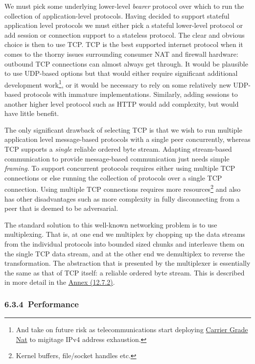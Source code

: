 \documentclass[11pt,a4paper]{article}
\begin{document}
We must pick some underlying lower-level \emph{bearer} protocol over
which to run the collection of application-level protocols. Having
decided to support stateful application level protocols we must either
pick a stateful lower-level protocol or add session or connection
support to a stateless protocol. The clear and obvious choice is then to
use TCP. TCP is the best supported internet protocol when it comes to
the thorny issues surrounding consumer NAT and firewall hardware:
outbound TCP connections can almost always get through. It would be
plausible to use UDP-based options but that would either require
significant additional development work\footnote{And take on future risk
  as telecommunications start deploying
  \href{https://en.wikipedia.org/wiki/Carrier-grade_NAT}{{Carrier Grade
  Nat}} to migitage IPv4 address exhaustion.}, or it would be necessary
to rely on some relatively new UDP-based protocols with immature
implementations. Similarly, adding sessions to another higher level
protocol such as HTTP would add complexity, but would have little
benefit.

The only significant drawback of selecting TCP is that we wish to run
multiple application level message-based protocols with a single peer
concurrently, whereas TCP supports a \emph{single} reliable ordered byte
stream. Adapting stream-based communication to provide message-based
communication just needs simple \emph{framing}. To support concurrent
protocols requires either using multiple TCP connections or else running
the collection of protocols over a single TCP connection. Using multiple
TCP connections requires more resources\footnote{Kernel buffers,
  file/socket handles etc.} and also has other disadvantages such as
more complexity in fully disconnecting from a peer that is deemed to be
adversarial.

The standard solution to this well-known networking problem is to use
multiplexing. That is, at one end we multiplex by chopping up the data
streams from the individual protocols into bounded sized chunks and
interleave them on the single TCP data stream, and at the other end we
demultiplex to reverse the transformation. The abstraction that is
presented by the multiplexer is essentially the same as that of TCP
itself: a reliable ordered byte stream. This is described in more detail
in the \protect\hyperlink{network-mux}{{Annex (12.7.2)}}.

\hypertarget{performance}{%
\subsubsection{​6.3.4​~Performance}\label{performance}}
\end{document}
